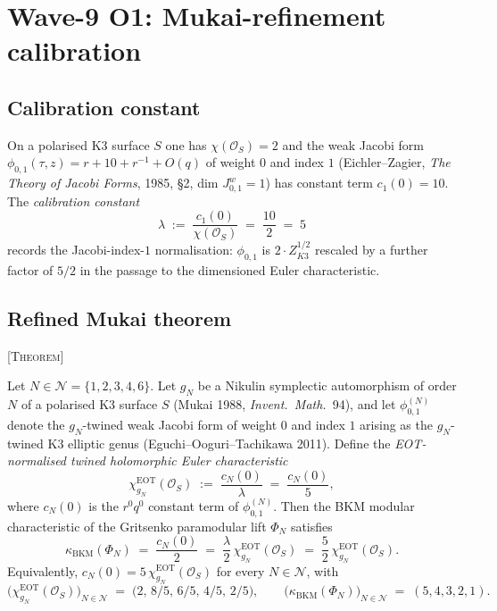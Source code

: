 
\providecommand{\BKM}{\mathrm{BKM}}
\providecommand{\EOT}{\mathrm{EOT}}
\providecommand{\AB}{\mathrm{AB}}
\providecommand{\cO}{\mathcal{O}}
\providecommand{\ClaimStatusTheorem}{\textsc{[Theorem]}}

\section*{Wave-9 O1: Mukai-refinement calibration}

\subsection*{Calibration constant}

On a polarised K3 surface $S$ one has $\chi(\cO_S) = 2$ and the
weak Jacobi form $\phi_{0,1}(\tau, z) = r + 10 + r^{-1} + O(q)$ of
weight $0$ and index $1$ (Eichler--Zagier, \emph{The Theory of Jacobi
Forms}, 1985, \S2, dim $J^w_{0,1} = 1$) has constant term
$c_1(0) = 10$.
The \emph{calibration constant}
\[
  \lambda \;:=\; \frac{c_1(0)}{\chi(\cO_S)}
            \;=\; \frac{10}{2} \;=\; 5
\]
records the Jacobi-index-$1$ normalisation: $\phi_{0,1}$ is
$2 \cdot Z_{K3}^{1/2}$ rescaled by a further factor of $5 / 2$ in the
passage to the dimensioned Euler characteristic.

\subsection*{Refined Mukai theorem} \ClaimStatusTheorem

\begin{theorem}
\label{thm:wave9-mukai-calibration}
Let $N \in \mathcal{N} = \{1, 2, 3, 4, 6\}$. Let $g_N$ be a Nikulin
symplectic automorphism of order $N$ of a polarised K3 surface $S$
(Mukai 1988, \emph{Invent.\ Math.}~94), and let $\phi_{0,1}^{(N)}$
denote the $g_N$-twined weak Jacobi form of weight $0$ and index $1$
arising as the $g_N$-twined K3 elliptic genus (Eguchi--Ooguri--Tachikawa
2011). Define the \emph{EOT-normalised twined holomorphic Euler
characteristic}
\[
  \chi_{g_N}^{\EOT}(\cO_S)
    \;:=\; \frac{c_N(0)}{\lambda}
    \;=\; \frac{c_N(0)}{5},
\]
where $c_N(0)$ is the $r^0 q^0$ constant term of $\phi_{0,1}^{(N)}$.
Then the BKM modular characteristic of the Gritsenko paramodular lift
$\Phi_N$ satisfies
\[
  \kappa_{\BKM}(\Phi_N)
    \;=\; \frac{c_N(0)}{2}
    \;=\; \frac{\lambda}{2}\,\chi_{g_N}^{\EOT}(\cO_S)
    \;=\; \frac{5}{2}\,\chi_{g_N}^{\EOT}(\cO_S).
\]
Equivalently, $c_N(0) = 5\,\chi_{g_N}^{\EOT}(\cO_S)$ for every
$N \in \mathcal{N}$, with
\[
  \bigl(\chi_{g_N}^{\EOT}(\cO_S)\bigr)_{N \in \mathcal{N}}
    \;=\; \bigl(2,\, 8/5,\, 6/5,\, 4/5,\, 2/5\bigr),
  \qquad
  \bigl(\kappa_{\BKM}(\Phi_N)\bigr)_{N \in \mathcal{N}}
    \;=\; (5, 4, 3, 2, 1).
\]
\end{theorem}

